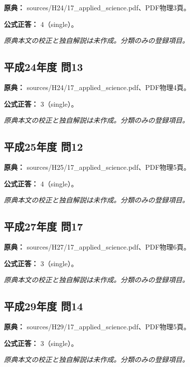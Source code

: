 \noindent\textbf{原典：} sources/H24/17\_applied\_science.pdf、PDF物理3頁。

\textbf{公式正答：} 4（single）。

\par\textit{原典本文の校正と独自解説は未作成。分類のみの登録項目。}

\subsection{平成24年度 問13}
\label{q:h24-reg-applied-13}

\noindent\textbf{原典：} sources/H24/17\_applied\_science.pdf、PDF物理4頁。

\textbf{公式正答：} 3（single）。

\par\textit{原典本文の校正と独自解説は未作成。分類のみの登録項目。}

\subsection{平成25年度 問12}
\label{q:h25-reg-applied-12}

\noindent\textbf{原典：} sources/H25/17\_applied\_science.pdf、PDF物理5頁。

\textbf{公式正答：} 4（single）。

\par\textit{原典本文の校正と独自解説は未作成。分類のみの登録項目。}

\subsection{平成27年度 問17}
\label{q:h27-reg-applied-17}

\noindent\textbf{原典：} sources/H27/17\_applied\_science.pdf、PDF物理6頁。

\textbf{公式正答：} 3（single）。

\par\textit{原典本文の校正と独自解説は未作成。分類のみの登録項目。}

\subsection{平成29年度 問14}
\label{q:h29-reg-applied-14}

\noindent\textbf{原典：} sources/H29/17\_applied\_science.pdf、PDF物理5頁。

\textbf{公式正答：} 3（single）。

\par\textit{原典本文の校正と独自解説は未作成。分類のみの登録項目。}

